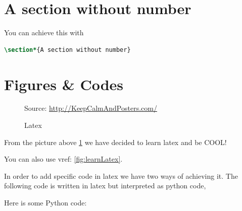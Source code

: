 \section*{A section without number}

You can achieve this with

\lstset{style=mystyle} 

\begin{lstlisting}[language=TeX,%
  caption={Example of a section command without numbering},%
  label=lst:latex_section_no_number]
  \section*{A section without number}
\end{lstlisting}
  

\section{Figures \& Codes}
\label{sec:fig}

\begin{figure}[thb]
  \centering

    {\scriptsize Source: \url{http://KeepCalmAndPosters.com/}%
  }

  \caption{Latex}
  \label{fig:learnLatex}
\end{figure}

From the picture above \ref{fig:learnLatex} we have decided to learn latex and
be COOL!

You can also use vref: \vref{fig:learnLatex}.

In order to add specific code in latex we have two ways of achieving it.
The following code is written in latex but interpreted as python code,


Here is some Python code:

